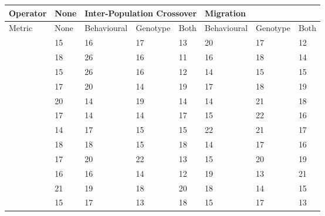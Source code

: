 \documentclass[12pt]{article} %
\begin{document}
\begin{sidewaystable} \centering \scriptsize
    \begin{tabular}{|l|l|l|l|l|l|l|l|}
    \hline
    Operator           & None        & \multicolumn{3}{l|}{Inter-Population Crossover} & \multicolumn{3}{l|}{Migration} \\ \hline
    Metric             & None        & Behavioural                & Genotype    & Both        & Behavioural & Genotype    & Both        \\ \hline
    ~                  & 15          & 16                         & 17          & 13          & 20          & 17          & 12          \\ \hline
    ~                  & 18          & 26                         & 16          & 11          & 16          & 18          & 14          \\ \hline
    ~                  & 15          & 26                         & 16          & 12          & 14          & 15          & 15          \\ \hline
    ~                  & 17          & 20                         & 14          & 19          & 17          & 18          & 19          \\ \hline
    ~                  & 20          & 14                         & 19          & 14          & 14          & 21          & 18          \\ \hline
    ~                  & 17          & 14                         & 14          & 17          & 15          & 22          & 16          \\ \hline
    ~                  & 14          & 17                         & 15          & 15          & 22          & 21          & 17          \\ \hline
    ~                  & 18          & 18                         & 15          & 18          & 14          & 17          & 16          \\ \hline
    ~                  & 17          & 20                         & 22          & 13          & 15          & 20          & 19          \\ \hline
    ~                  & 16          & 16                         & 14          & 12          & 19          & 13          & 21          \\ \hline
    ~                  & 21          & 19                         & 18          & 20          & 18          & 14          & 15          \\ \hline
    ~                  & 15          & 17                         & 13          & 18          & 15          & 17          & 13          \\ \hline

\end{tabular}
\end{sidewaystable}
\end{document}
